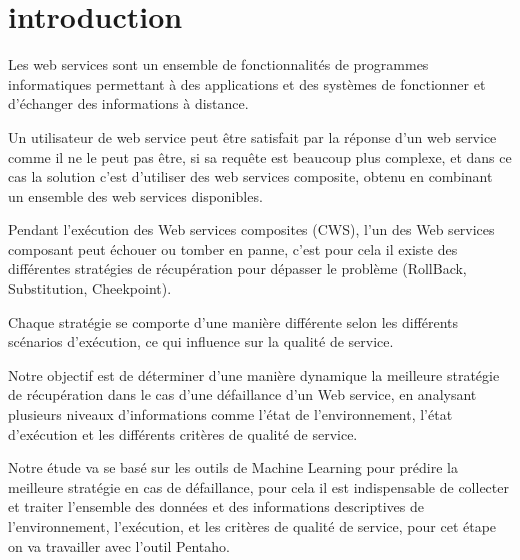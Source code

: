 \vspace{1cm}


\chapter{introduction}

Les web services sont un ensemble de fonctionnalités de programmes informatiques permettant à des applications et des systèmes de fonctionner et d'échanger des informations à distance.

Un utilisateur de web service peut être satisfait par la réponse d’un web service comme il ne le peut pas être, si sa requête est beaucoup plus complexe, et dans ce cas la solution c’est d’utiliser des web services composite, obtenu en combinant un ensemble des web services disponibles.

Pendant l'exécution des Web services composites (CWS), l’un des Web services composant peut échouer ou tomber en panne, c’est pour cela il existe des différentes stratégies de récupération pour dépasser le problème (RollBack, Substitution, Cheekpoint).

Chaque stratégie se comporte d’une manière différente selon les différents scénarios d’exécution, ce qui influence sur la qualité de service.

Notre objectif est de déterminer d’une manière dynamique  la meilleure stratégie de récupération  dans le cas d’une défaillance d’un Web service, en analysant  plusieurs niveaux d'informations comme l’état de l'environnement, l’état d'exécution et les différents critères de qualité de service.

Notre étude va se basé sur les outils de Machine Learning pour prédire la meilleure stratégie en cas de défaillance, pour cela il est indispensable de collecter et traiter l’ensemble des données et des informations descriptives de l’environnement, l’exécution, et les critères de qualité de service, pour cet étape on va travailler avec l’outil Pentaho.
